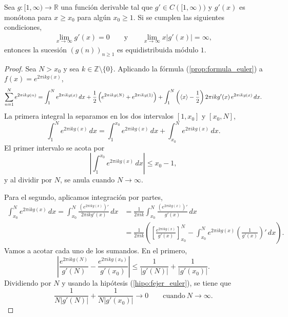 \begin{theorem}
    \label{teo:fejer_euler}
    Sea $g:[1,\infty) \to \mathbb{R}$ una función derivable tal que $g' \in C([1,\infty))$ y $g'(x)$ 
    es monótona para $x \geq x_0$ para algún $x_0 \geq 1$. Si se cumplen las siguientes condiciones,
    \begin{align}
        \label{hipo:fejer_euler}
        \lim_{x \to \infty} g'(x) = 0
        \qquad \text{y} \qquad
        \lim_{x \to \infty} {x \left|g'(x)\right|} = \infty,
    \end{align}
    entonces la sucesión $(g(n))_{n\geq1}$ es equidistribuida módulo $1$.
\end{theorem}

\begin{proof}
    Sea $N > x_0$ y sea $k \in \mathbb{Z}\setminus\{0\}$. 
    Aplicando la fórmula (\ref{prop:formula_euler}) a $f(x) = e^{2\pi i k g(x)}$,
    \[
        \sum_{n=1}^N e^{2\pi i k g(n)}
        = \int_1^N e^{2\pi i k g(x)} \, dx 
        + \frac{1}{2} \left(e^{2\pi i k g(N)} + e^{2\pi i k g(1)}\right)
        + \int_1^N \left(\langle x \rangle - \frac{1}{2}\right) 2\pi i k g'(x) \, e^{2\pi i k g(x)} \, dx.
    \]
    La primera integral la separamos en los dos intervalos $[1,x_0]$ y $[x_0,N]$,
    \[
        \int_1^N e^{2\pi i k g(x)} \,dx = 
        \int_1^{x_0} e^{2\pi i k g(x)} \, dx + 
        \int_{x_0}^N e^{2\pi i k g(x)} \, dx.
    \]
    El primer intervalo se acota por
    \[
        \left|\int_1^{x_0} e^{2\pi i k g(x)} \, dx\right| \leq x_0 - 1,
    \]
    y al dividir por $N$, se anula cuando $N \to \infty$.
    
    Para el segundo, aplicamos integración por partes,
    \begin{align*}
        \int_{x_0}^N e^{2\pi i k g(x)} \, dx 
        = \int_{x_0}^N \frac{\left(e^{2\pi i k g(x)}\right)'}{2\pi i k g'(x)} \, dx
        &= \frac{1}{2 \pi i k} \int_{x_0}^N \frac{\left(e^{2\pi i k g(x)}\right)'}{g'(x)} \, dx \\
        &= \frac{1}{2 \pi i k} \left(\left[\frac{e^{2\pi i k g(x)}}{g'(x)}\right]_{x_0}^N - 
        \int_{x_0}^N e^{2\pi i k g(x)} \left(\frac{1}{g'(x)}\right)' \, dx \right).
    \end{align*}
    Vamos a acotar cada uno de los sumandos. En el primero,
    \[
        \left|\frac{e^{2\pi i k g(N)}}{g'(N)} - \frac{e^{2\pi i k g(x_0)}}{g'(x_0)}\right|
        \leq \frac{1}{|g'(N)|} + \frac{1}{|g'(x_0)|}.
    \]
    Dividiendo por $N$ y usando la hipótesis (\ref{hipo:fejer_euler}), se tiene que
    \[
        \frac{1}{N |g'(N)|} + \frac{1}{N |g'(x_0)|} \longrightarrow 0 \qquad \text{cuando} \ N \to \infty.
    \]
    

\end{proof}
